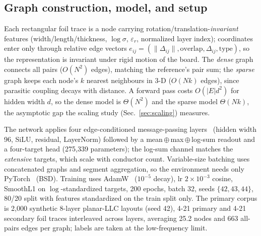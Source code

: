 \documentclass[letterpaper,twocolumn,9pt]{extarticle}
\begin{document}
\subsection{Graph construction, model, and setup}
Each rectangular foil trace is a node carrying rotation/translation-\emph{invariant}
features (width/length/thickness, $\log\sigma$, $\varepsilon_r$, normalized layer
index); coordinates enter only through relative edge vectors
$e_{ij}=(\lVert\Delta_{ij}\rVert,\mathrm{overlap},\Delta_{ij},\mathrm{type})$, so
the representation is invariant under rigid motion of the board. The \emph{dense}
graph connects all pairs ($O(N^2)$ edges), matching the reference's pair sum; the
\emph{sparse} graph keeps each node's $k$ nearest neighbours in 3-D ($O(Nk)$
edges), since parasitic coupling decays with distance. A forward pass costs
$O(|E|d^2)$ for hidden width $d$, so the dense model is $\Theta(N^2)$ and the
sparse model $\Theta(Nk)$, the asymptotic gap the scaling study
(Sec.~\ref{sec:scaling}) measures.

The network applies four edge-conditioned message-passing
layers~\cite{gilmer} (hidden width 96, SiLU, residual, LayerNorm) followed by a
mean\,$\oplus$\,max\,$\oplus$\,log-sum readout and a four-target head
(275{,}339 parameters); the log-sum channel matches the \emph{extensive} targets,
which scale with conductor count. Variable-size batching uses concatenated graphs
and segment aggregation, so the environment needs only PyTorch~\cite{pytorch}
(BSD). Training uses AdamW~\cite{adamw} ($10^{-5}$ decay), lr $2\times10^{-3}$
cosine, SmoothL1 on $\log$-standardized targets, 200 epochs, batch 32, seeds
$\{42,43,44\}$, 80/20 split with features standardized on the train split only.
The primary corpus is 2{,}000 synthetic 8-layer planar-LLC layouts (seed 42),
4-21 primary and 4-21 secondary foil traces interleaved across layers, averaging
25.2 nodes and 663 all-pairs edges per graph; labels are taken at the
low-frequency limit.
\end{document}
